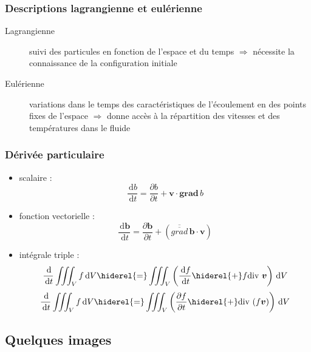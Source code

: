 \documentclass[%
	final, %
	 10pt, %
 	compress, %
hyperref={bookmarks=true}	
]{beamer}
\renewcommand{\v}[1]{\ensuremath{\bm{#1}}} %
\newcommand{\ddr}[1]{\, \mathrm{d} #1}
\newcommand{\grad}[1]{\bm{grad} \, {#1}}
\newcommand{\gradd}[1]{\overline{\overline{grad}} \, \bm{#1}}
\newcommand{\diver}[1]{\textrm{div} \ {#1}}
\begin{document}
\begin{frame}\frametitle{Descriptions lagrangienne et eulérienne}
\begin{description}
\item[Lagrangienne] suivi des particules en fonction
  de l'espace et du temps $\Rightarrow$ nécessite la connaissance de
  la configuration initiale
\item[Eulérienne] variations dans le temps des caractéristiques de
  l'écoulement en des points fixes de l'espace   $\Rightarrow$ donne
  accès à la répartition des vitesses et des températures dans le fluide
\end{description}
\end{frame}

\begin{frame}\frametitle{Dérivée particulaire}
\begin{itemize}
\item scalaire : 
\begin{dmath*}
\dfrac{\ddr b}{ \ddr t} = \dfrac{\partial
    b}{\partial t} + \v{v} \cdot \grad{b}
\end{dmath*}
\item fonction vectorielle : 
\begin{dmath*}
\dfrac{\ddr \v{b}}{ \ddr t} = \dfrac{\partial
    \v{b}}{\partial t} + \left(\gradd{b} \cdot \v{v}\right) 
\end{dmath*}
\item intégrale triple : 
\begin{dmath*}
\dfrac{\ddr}{ \ddr t} \iiint_{V} f \ddr V \hiderel{=}
  \iiint_{V} \left( \dfrac{\ddr f}{\ddr t} \hiderel{+} f \diver{\v{v}} \right)
 \ddr V
\end{dmath*}
\begin{dmath*}
\dfrac{\ddr}{ \ddr t} \iiint_{V} f \ddr V \hiderel{=} \iiint_{V} \left(  \dfrac{\partial f}{\partial t} \hiderel{+} \diver{( f \v{v})} \right)
 \ddr V
\end{dmath*}
\end{itemize}
\end{frame}

\subsection{Quelques images}
\label{sec:quelques-images}


\begin{frame}\frametitle{}


\end{frame}
\end{document}
